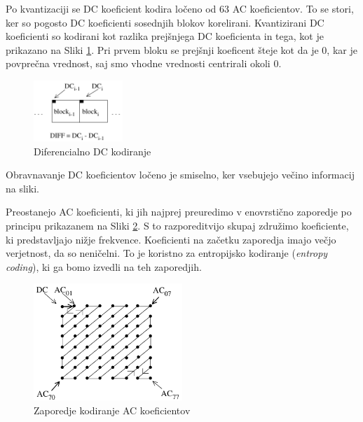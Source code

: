\documentclass[a4paper,12pt,openright]{book}
\begin{document}
Po kvantizaciji se DC koeficient kodira ločeno od 63 AC koeficientov. To se stori, ker so pogosto DC koeficienti sosednjih blokov korelirani. Kvantizirani DC koeficienti so kodirani kot razlika prejšnjega DC koeficienta in tega, kot je prikazano na Sliki \ref{Diferencialno_kodiranje_DC}. Pri prvem bloku se prejšnji koeficent šteje kot da je 0, kar je povprečna vrednost, saj smo vhodne vrednosti centrirali okoli 0.
\begin{figure}[ht] %
\begin{center}
\includegraphics[width=0.3\textwidth]{slike/Diferencialno_kodiranje_DC.pdf}
\end{center}
\caption{Diferencialno DC kodiranje}
\label{Diferencialno_kodiranje_DC}
\end{figure}
Obravnavanje DC koeficientov ločeno je smiselno, ker vsebujejo večino informacij na sliki. \par
Preostanejo AC koeficienti, ki jih najprej preuredimo v enovrstično zaporedje po principu prikazanem na Sliki \ref{zig_zag_zaporedje}. S to razporeditvijo skupaj združimo koeficiente, ki predstavljajo nižje frekvence. Koeficienti na začetku zaporedja imajo večjo verjetnost, da so neničelni. To je koristno za entropijsko kodiranje (\textit{entropy coding}), ki ga bomo izvedli na teh zaporedjih.\par
\begin{figure}[ht] %
\begin{center}
\includegraphics[width=0.5\textwidth]{slike/zig_zag_zaporedje.pdf}
\end{center}
\caption{Zaporedje kodiranje AC koeficientov}
\label{zig_zag_zaporedje}
\end{figure}
\end{document}
